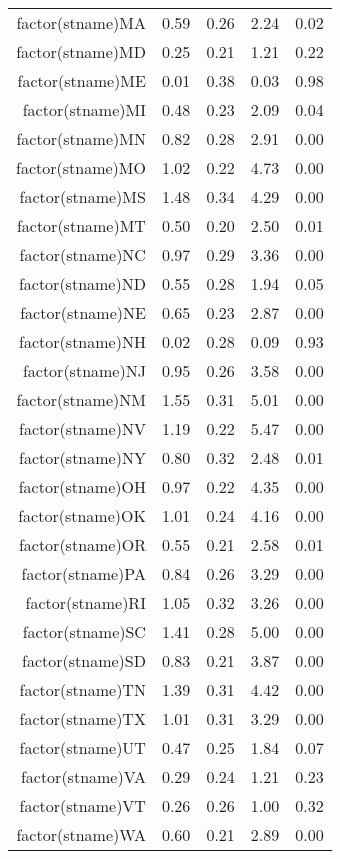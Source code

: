 \begin{table}[ht]
\begin{tabular}{rrrrr}
  factor(stname)MA & 0.59 & 0.26 & 2.24 & 0.02 \\ 
  factor(stname)MD & 0.25 & 0.21 & 1.21 & 0.22 \\ 
  factor(stname)ME & 0.01 & 0.38 & 0.03 & 0.98 \\ 
  factor(stname)MI & 0.48 & 0.23 & 2.09 & 0.04 \\ 
  factor(stname)MN & 0.82 & 0.28 & 2.91 & 0.00 \\ 
  factor(stname)MO & 1.02 & 0.22 & 4.73 & 0.00 \\ 
  factor(stname)MS & 1.48 & 0.34 & 4.29 & 0.00 \\ 
  factor(stname)MT & 0.50 & 0.20 & 2.50 & 0.01 \\ 
  factor(stname)NC & 0.97 & 0.29 & 3.36 & 0.00 \\ 
  factor(stname)ND & 0.55 & 0.28 & 1.94 & 0.05 \\ 
  factor(stname)NE & 0.65 & 0.23 & 2.87 & 0.00 \\ 
  factor(stname)NH & 0.02 & 0.28 & 0.09 & 0.93 \\ 
  factor(stname)NJ & 0.95 & 0.26 & 3.58 & 0.00 \\ 
  factor(stname)NM & 1.55 & 0.31 & 5.01 & 0.00 \\ 
  factor(stname)NV & 1.19 & 0.22 & 5.47 & 0.00 \\ 
  factor(stname)NY & 0.80 & 0.32 & 2.48 & 0.01 \\ 
  factor(stname)OH & 0.97 & 0.22 & 4.35 & 0.00 \\ 
  factor(stname)OK & 1.01 & 0.24 & 4.16 & 0.00 \\ 
  factor(stname)OR & 0.55 & 0.21 & 2.58 & 0.01 \\ 
  factor(stname)PA & 0.84 & 0.26 & 3.29 & 0.00 \\ 
  factor(stname)RI & 1.05 & 0.32 & 3.26 & 0.00 \\ 
  factor(stname)SC & 1.41 & 0.28 & 5.00 & 0.00 \\ 
  factor(stname)SD & 0.83 & 0.21 & 3.87 & 0.00 \\ 
  factor(stname)TN & 1.39 & 0.31 & 4.42 & 0.00 \\ 
  factor(stname)TX & 1.01 & 0.31 & 3.29 & 0.00 \\ 
  factor(stname)UT & 0.47 & 0.25 & 1.84 & 0.07 \\ 
  factor(stname)VA & 0.29 & 0.24 & 1.21 & 0.23 \\ 
  factor(stname)VT & 0.26 & 0.26 & 1.00 & 0.32 \\ 
  factor(stname)WA & 0.60 & 0.21 & 2.89 & 0.00 \\ 

\end{tabular}
\end{table}
